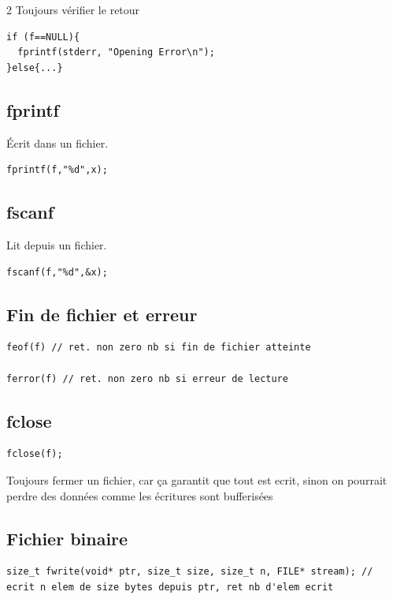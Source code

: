 \documentclass[8pt]{article}
\begin{document}
\begin{multicols}{2}
Toujours vérifier le retour

\begin{lstlisting}
if (f==NULL){
  fprintf(stderr, "Opening Error\n");
}else{...}
\end{lstlisting}

\subsection{fprintf}

Écrit dans un fichier.
\begin{lstlisting}
fprintf(f,"%d",x);
\end{lstlisting}

\subsection{fscanf}

Lit depuis un fichier.

\begin{lstlisting}
fscanf(f,"%d",&x);
\end{lstlisting}

\subsection{Fin de fichier et erreur}
\begin{lstlisting}
feof(f) // ret. non zero nb si fin de fichier atteinte

ferror(f) // ret. non zero nb si erreur de lecture
\end{lstlisting}

\subsection{fclose}

\begin{lstlisting}
fclose(f);
\end{lstlisting}
Toujours fermer un fichier, car ça garantit que tout est ecrit, sinon on pourrait perdre des données comme les écritures sont bufferisées 

\subsection{Fichier binaire}
\begin{lstlisting}
size_t fwrite(void* ptr, size_t size, size_t n, FILE* stream); // ecrit n elem de size bytes depuis ptr, ret nb d'elem ecrit


\end{lstlisting}
\end{multicols}
\end{document}
